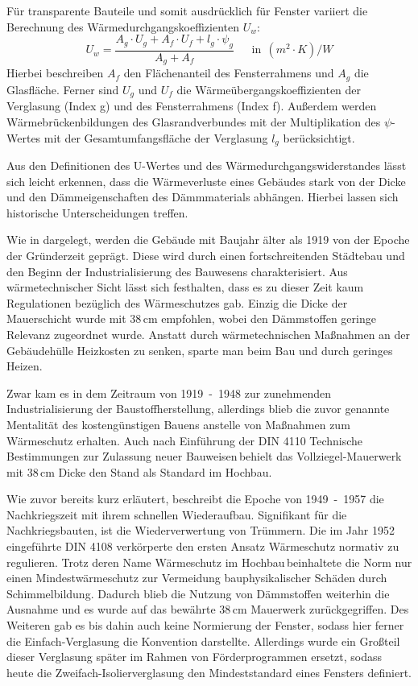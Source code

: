 Für transparente Bauteile und somit ausdrücklich für Fenster variiert die Berechnung des Wärmedurchgangskoeffizienten \(U_w\):
\begin{equation}
\label{eq:Gleichung223}
U_w = \frac{A_g \cdot U_g + A_f \cdot U_f + l_g \cdot \psi_g}{A_g + A_f}  \ \ \ \ \ \ \ \text{in} \ \ (m^2 \cdot K)/W
\end{equation}
Hierbei beschreiben \(A_f\) den Flächenanteil des Fensterrahmens und \(A_g\) die Glasfläche. Ferner sind \(U_g\) und \(U_f\) die Wärmeübergangskoeffizienten der Verglasung (Index g) und des Fensterrahmens (Index f). 
Außerdem werden Wärmebrückenbildungen des Glasrandverbundes mit der Multiplikation des \(\psi\)-Wertes mit der Gesamtumfangsfläche der Verglasung \(l_g\) berücksichtigt. \cite{Laasch.2013}

Aus den Definitionen des U-Wertes und des Wärmedurchgangswiderstandes lässt sich leicht erkennen, dass die Wärmeverluste eines Gebäudes stark von der Dicke und den Dämmeigenschaften des Dämmmaterials abhängen. 
Hierbei lassen sich historische Unterscheidungen treffen.

Wie in \cite{.2015} dargelegt, werden die Gebäude mit Baujahr älter als 1919 von der Epoche der Gründerzeit geprägt.
Diese wird durch einen fortschreitenden Städtebau und den Beginn der Industrialisierung des Bauwesens charakterisiert. 
Aus wärmetechnischer Sicht lässt sich festhalten, dass es zu dieser Zeit kaum Regulationen bezüglich des Wärmeschutzes gab. 
Einzig die Dicke der Mauerschicht wurde mit 38\,cm empfohlen, wobei den Dämmstoffen geringe Relevanz zugeordnet wurde. 
Anstatt durch wärmetechnischen Maßnahmen an der Gebäudehülle Heizkosten zu senken, sparte man beim Bau und durch geringes Heizen. \cite{EickeHenning.2011}

Zwar kam es in dem Zeitraum von \mbox{1919 - 1948} zur zunehmenden Industrialisierung der Baustoffherstellung, allerdings blieb die zuvor genannte Mentalität des kostengünstigen Bauens anstelle von Maßnahmen zum Wärmeschutz erhalten. 
Auch nach Einführung der DIN 4110 \glqq Technische Bestimmungen zur Zulassung neuer Bauweisen\grqq\,behielt das Vollziegel-Mauerwerk mit 38\,cm Dicke den Stand als Standard im Hochbau. 
\cite{EickeHenning.2011}

Wie zuvor bereits kurz erläutert, beschreibt die Epoche von \mbox{1949 - 1957} die Nachkriegszeit mit ihrem schnellen Wiederaufbau. 
Signifikant für die Nachkriegsbauten, ist die Wiederverwertung von Trümmern. 
Die im Jahr 1952 eingeführte DIN 4108 verkörperte den ersten Ansatz Wärmeschutz normativ zu regulieren. 
Trotz deren Name \glqq Wärmeschutz im Hochbau\grqq \,beinhaltete die Norm nur einen Mindestwärmeschutz zur Vermeidung bauphysikalischer Schäden durch Schimmelbildung. 
Dadurch blieb die Nutzung von Dämmstoffen weiterhin die Ausnahme und es wurde auf das bewährte 38\,cm Mauerwerk zurückgegriffen.
Des Weiteren gab es bis dahin auch keine Normierung der Fenster, sodass hier ferner die Einfach-Verglasung die Konvention darstellte.
Allerdings wurde ein Großteil dieser Verglasung später im Rahmen von Förderprogrammen ersetzt, sodass heute die Zweifach-Isolierverglasung den Mindeststandard eines Fensters definiert. \cite{EickeHenning.2011}

